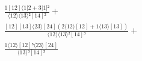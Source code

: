 \documentclass[varwidth, border=5pt]{standalone}
\begin{document}
\begin{my}
$\begin{gathered}
\scriptscriptstyle\frac{1[12]⟨1|2+3|1]²}{⟨12⟩⟨13⟩²[14]²} +\\
\scriptscriptstyle\frac{[12][13]⟨23⟩[24](2⟨12⟩[12]+1⟨13⟩[13])}{⟨12⟩⟨13⟩²[14]³} +\\
\scriptscriptstyle\frac{1⟨12⟩[12]³⟨23⟩[24]}{⟨13⟩³[14]³} \phantom{+}
\end{gathered}$
\end{my}
\end{document}
